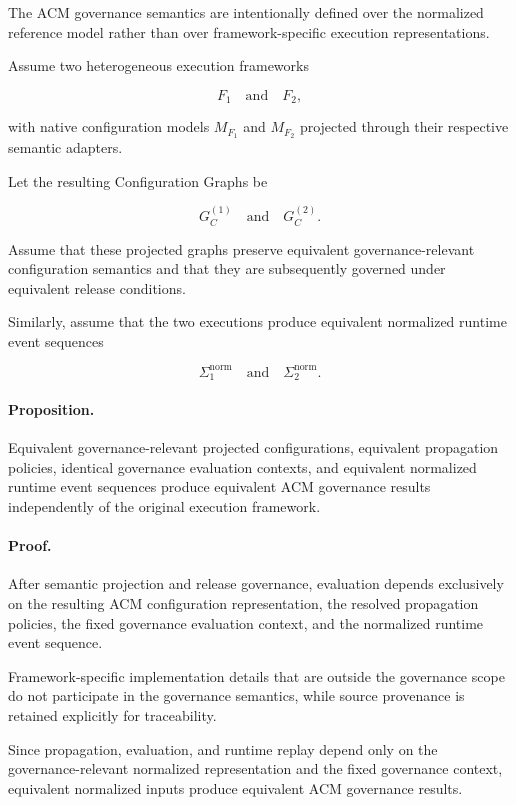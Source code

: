 \documentclass[10pt]{article}
\begin{document}
The ACM governance semantics are intentionally defined over the normalized reference model rather than over framework-specific execution representations.

Assume two heterogeneous execution frameworks

\[
F_1
\quad\text{and}\quad
F_2,
\]

with native configuration models $M_{F_1}$ and $M_{F_2}$ projected through
their respective semantic adapters.

Let the resulting Configuration Graphs be

\[
G_C^{(1)}
\quad\text{and}\quad
G_C^{(2)}.
\]

Assume that these projected graphs preserve equivalent governance-relevant
configuration semantics and that they are subsequently governed under
equivalent release conditions.

Similarly, assume that the two executions produce equivalent normalized runtime
event sequences

\[
\Sigma_1^{\mathrm{norm}}
\quad\text{and}\quad
\Sigma_2^{\mathrm{norm}}.
\]

\paragraph*{Proposition.}

Equivalent governance-relevant projected configurations, equivalent propagation
policies, identical governance evaluation contexts, and equivalent normalized
runtime event sequences produce equivalent ACM governance results independently
of the original execution framework.

\paragraph*{Proof.}

After semantic projection and release governance, evaluation depends exclusively
on the resulting ACM configuration representation, the resolved propagation
policies, the fixed governance evaluation context, and the normalized runtime
event sequence.

Framework-specific implementation details that are outside the governance scope
do not participate in the governance semantics, while source provenance is
retained explicitly for traceability.

Since propagation, evaluation, and runtime replay depend only on the
governance-relevant normalized representation and the fixed governance context,
equivalent normalized inputs produce equivalent ACM governance results.
\end{document}
